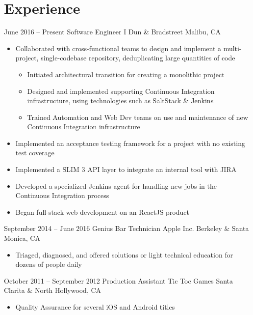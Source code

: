 \documentclass[11pt,a4paper,sans]{moderncv}        %
\begin{document}
\makecvtitle

\section{Experience}        %

\cventry
{June 2016 -- Present}          {Software Engineer I}
{Dun \& Bradstreet}             {Malibu, CA}
{}
{
\begin{itemize}
    \item Collaborated with cross-functional teams to design and implement a multi-project, single-codebase repository, deduplicating large quantities of code
    \begin{itemize}
        \item Initiated architectural transition for creating a monolithic project
        \item Designed and implemented supporting Continuous Integration infrastructure, using technologies such as SaltStack \& Jenkins
        \item Trained Automation and Web Dev teams on use and maintenance of new Continuous Integration infrastructure
    \end{itemize}
    \item Implemented an acceptance testing framework for a project with no existing test coverage
    \item Implemented a SLIM 3 API layer to integrate an internal tool with JIRA
    \item Developed a specialized Jenkins agent for handling new jobs in the Continuous Integration process
    \item Began full-stack web development on an ReactJS product
\end{itemize}
}   %

\cventry
{September 2014 -- June 2016}	{Genius Bar Technician}
{Apple Inc.}	                {Berkeley \& Santa Monica, CA}
{}
{
\begin{itemize}
    \item Triaged, diagnosed, and offered solutions or light technical education for dozens of people daily
\end{itemize}
}   %

\cventry
{October 2011 -- September 2012}	{Production Assistant}
{Tic Toc Games}	{Santa Clarita \& North Hollywood, CA}
{}
{
\begin{itemize}
    \item Quality Assurance for several iOS and Android titles
\end{itemize}
}   %
\end{document}
